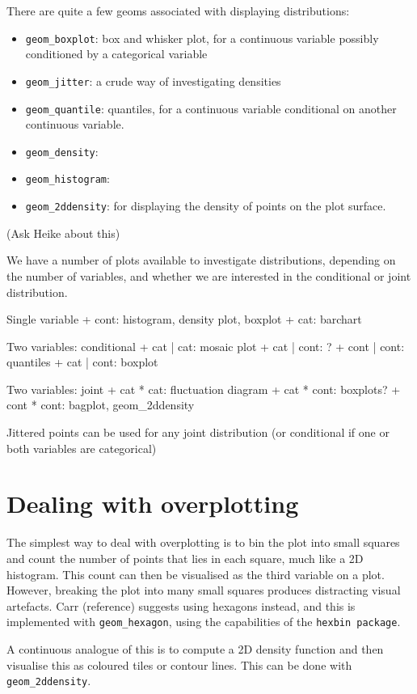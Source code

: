 There are quite a few geoms associated with displaying distributions:

\begin{itemize}
	\item {\tt geom\_boxplot}: box and whisker plot, for a continuous variable possibly conditioned by a categorical variable
	\item {\tt geom\_jitter}: a crude way of investigating densities
	\item {\tt geom\_quantile}: quantiles, for a continuous variable conditional on another continuous variable.
	\item {\tt geom\_density}: 
	\item {\tt geom\_histogram}: 
	\item {\tt geom\_2ddensity}: for displaying the density of points on the plot surface.
\end{itemize}

(Ask Heike about this)

We have a number of plots available to investigate distributions, depending on the number of variables, and whether we are interested in the conditional or joint distribution.

Single variable
+ cont: histogram, density plot, boxplot
+ cat:  barchart

Two variables: conditional
+ cat  | cat:  mosaic plot
+ cat  | cont: ?
+ cont | cont: quantiles
+ cat  | cont: boxplot

Two variables: joint
+ cat  * cat:  fluctuation diagram
+ cat  * cont: boxplots?
+ cont * cont: bagplot, geom\_2ddensity

Jittered points can be used for any joint distribution (or conditional if one or both variables are categorical)

\section{Dealing with overplotting}\label{sec:overplotting}

The simplest way to deal with overplotting is to bin the plot into small squares and count the number of points that lies in each square, much like a 2D histogram.  This count can then be visualised as the third variable on a plot.  However, breaking the plot into many small squares produces distracting visual artefacts.  Carr (reference) suggests using hexagons instead, and this is implemented with {\tt geom\_hexagon}, using the capabilities of the {\tt hexbin package}.

A continuous analogue of this is to compute a 2D density function and then visualise this as coloured tiles or contour lines.  This can be done with {\tt geom\_2ddensity}.


